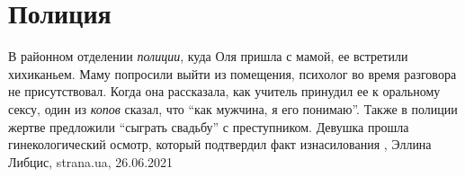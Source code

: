  
 
 
 
 
\chapter{Полиция}

В районном отделении \emph{полиции}, куда Оля пришла с мамой, ее встретили хихиканьем.
Маму попросили выйти из помещения, психолог во время разговора не
присутствовал. Когда она рассказала, как учитель принудил ее к оральному сексу,
один из \emph{копов} сказал, что \enquote{как мужчина, я его понимаю}. Также в полиции жертве
предложили \enquote{сыграть свадьбу} с преступником.  Девушка прошла гинекологический
осмотр, который подтвердил факт изнасилования
, Эллина Либцис, strana.ua, 26.06.2021

